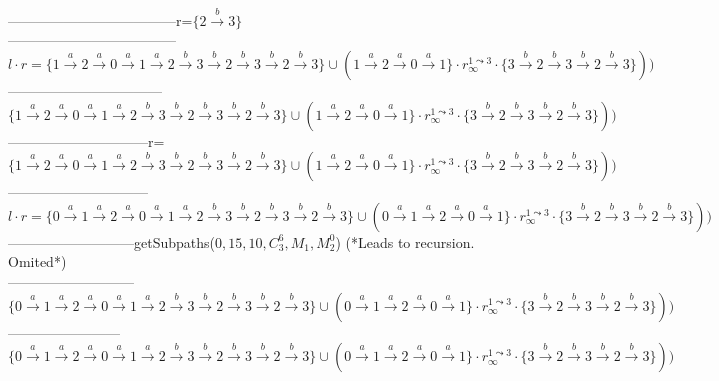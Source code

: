 {------------------------------------r=$\{2 \xrightarrow{b} 3\}$\\
------------------------------------$l\cdot r = \{1 \xrightarrow{a} 2 \xrightarrow{a} 0 \xrightarrow{a} 1 \xrightarrow{a} 2 \xrightarrow{b} 3 \xrightarrow{b} 2 \xrightarrow{b} 3 \xrightarrow{b} 2 \xrightarrow{b} 3\} \cup (1 \xrightarrow{a} 2 \xrightarrow{a} 0 \xrightarrow{a} 1\} \cdot r_\infty^{1\leadsto 3} \cdot \{3 \xrightarrow{b} 2 \xrightarrow{b} 3 \xrightarrow{b} 2 \xrightarrow{b} 3\}))$\\
---------------------------------$\{1 \xrightarrow{a} 2 \xrightarrow{a} 0 \xrightarrow{a} 1 \xrightarrow{a} 2 \xrightarrow{b} 3 \xrightarrow{b} 2 \xrightarrow{b} 3 \xrightarrow{b} 2 \xrightarrow{b} 3\} \cup (1 \xrightarrow{a} 2 \xrightarrow{a} 0 \xrightarrow{a} 1\} \cdot r_\infty^{1\leadsto 3} \cdot \{3 \xrightarrow{b} 2 \xrightarrow{b} 3 \xrightarrow{b} 2 \xrightarrow{b} 3\}))$\\
------------------------------r=$\{1 \xrightarrow{a} 2 \xrightarrow{a} 0 \xrightarrow{a} 1 \xrightarrow{a} 2 \xrightarrow{b} 3 \xrightarrow{b} 2 \xrightarrow{b} 3 \xrightarrow{b} 2 \xrightarrow{b} 3\} \cup (1 \xrightarrow{a} 2 \xrightarrow{a} 0 \xrightarrow{a} 1\} \cdot r_\infty^{1\leadsto 3} \cdot \{3 \xrightarrow{b} 2 \xrightarrow{b} 3 \xrightarrow{b} 2 \xrightarrow{b} 3\}))$\\
------------------------------$l \cdot r = \{0 \xrightarrow{a} 1 \xrightarrow{a} 2 \xrightarrow{a} 0 \xrightarrow{a} 1 \xrightarrow{a} 2 \xrightarrow{b} 3 \xrightarrow{b} 2 \xrightarrow{b} 3 \xrightarrow{b} 2 \xrightarrow{b} 3\} \cup (0 \xrightarrow{a} 1 \xrightarrow{a} 2 \xrightarrow{a} 0 \xrightarrow{a} 1\} \cdot r_\infty^{1\leadsto 3} \cdot \{3 \xrightarrow{b} 2 \xrightarrow{b} 3 \xrightarrow{b} 2 \xrightarrow{b} 3\}))$\\
---------------------------getSubpaths($0,15,10,C_3^6,M_1,M_2^0$) (*Leads to recursion. Omited*)\\
---------------------------$\{0 \xrightarrow{a} 1 \xrightarrow{a} 2 \xrightarrow{a} 0 \xrightarrow{a} 1 \xrightarrow{a} 2 \xrightarrow{b} 3 \xrightarrow{b} 2 \xrightarrow{b} 3 \xrightarrow{b} 2 \xrightarrow{b} 3\} \cup (0 \xrightarrow{a} 1 \xrightarrow{a} 2 \xrightarrow{a} 0 \xrightarrow{a} 1\} \cdot r_\infty^{1\leadsto 3} \cdot \{3 \xrightarrow{b} 2 \xrightarrow{b} 3 \xrightarrow{b} 2 \xrightarrow{b} 3\}))$\\
------------------------$\{0 \xrightarrow{a} 1 \xrightarrow{a} 2 \xrightarrow{a} 0 \xrightarrow{a} 1 \xrightarrow{a} 2 \xrightarrow{b} 3 \xrightarrow{b} 2 \xrightarrow{b} 3 \xrightarrow{b} 2 \xrightarrow{b} 3\} \cup (0 \xrightarrow{a} 1 \xrightarrow{a} 2 \xrightarrow{a} 0 \xrightarrow{a} 1\} \cdot r_\infty^{1\leadsto 3} \cdot \{3 \xrightarrow{b} 2 \xrightarrow{b} 3 \xrightarrow{b} 2 \xrightarrow{b} 3\}))$\\
}
